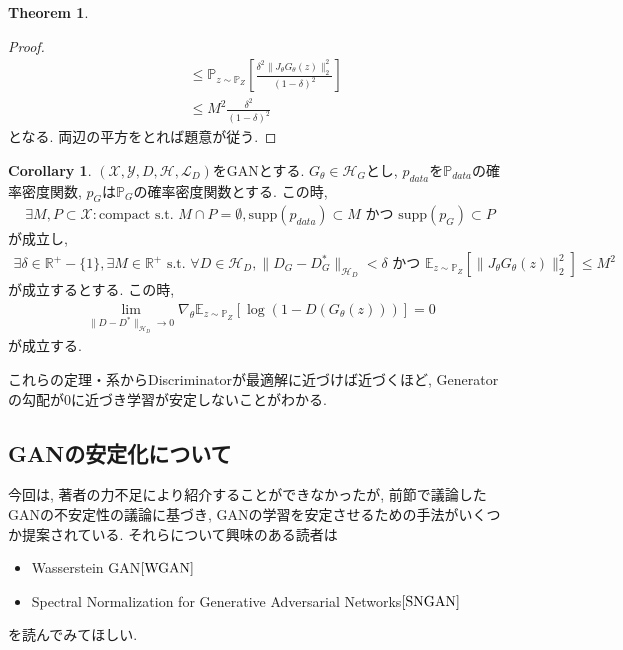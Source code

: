 \documentclass[11pt, a4paper, dvipdfmx]{jsarticle}
\theoremstyle{definition}
\newtheorem{Theorem+}[Axiom+]{Theorem}
\newtheorem{Corollary+}[Axiom+]{Corollary}
\newcommand{\R}{\mathbb{R}}
\newcommand{\X}{\mathcal{X}}
\newcommand{\Y}{\mathcal{Y}}
\newcommand{\Hil}{\mathcal{H}}
\newcommand{\Loss}{\mathcal{L}_{D}}
\newcommand{\MLsp}{(\X, \Y, D, \Hil, \Loss)}
\begin{document}
\begin{Theorem+}
\begin{proof}
\begin{align*}
                                                                                                    &\leq\mathbb{P}_{z\sim\mathbb{P}_{Z}}\left[ \frac{\delta^{2}\|J_{\theta}G_{\theta}(z)\|_{2}^{2}}{(1 - \delta)^{2}} \right]\\
                                                                                                    &\leq M^{2}\frac{\delta^{2}}{(1 - \delta)^{2}}
        \end{align*}
        となる. 両辺の平方をとれば題意が従う. 
    \end{proof}
\end{Theorem+}
\begin{Corollary+}
    $\MLsp$をGANとする. $G_{\theta}\in\Hil_{G}$とし, $p_{data}$を$\mathbb{P}_{data}$の確率密度関数, $p_{G}$は$\mathbb{P}_{G}$の確率密度関数とする. この時, 
    \begin{align*}
        \exists M, P\subset\X:\text{compact s.t. }M\cap P = \emptyset, \text{supp}(p_{data})\subset M\text{ かつ }\text{supp}(p_{G})\subset P
    \end{align*}
    が成立し, 
    \begin{align*}
        \exists\delta\in\R^{+}-\{1\}, \exists M\in\R^{+}\text{ s.t. }\forall D\in\Hil_{D}, \|D_{G} - D_{G}^{*}\|_{\Hil_{D}} <\delta\text{ かつ }\mathbb{E}_{z\sim\mathbb{P}_{Z}}[\|J_{\theta}G_{\theta}(z)\|_{2}^{2}] \leq M^{2}
    \end{align*}
    が成立するとする. この時, 
    \begin{align*}
        \lim_{\|D - D^{*}\|_{\Hil_{D}}\to0}\nabla_{\theta}\mathbb{E}_{z\sim\mathbb{P}_{Z}}[\log(1 - D(G_{\theta}(z)))] = 0
    \end{align*}
    が成立する. 
\end{Corollary+}
これらの定理・系からDiscriminatorが最適解に近づけば近づくほど, Generatorの勾配が0に近づき学習が安定しないことがわかる.
\subsection{GANの安定化について}
今回は, 著者の力不足により紹介することができなかったが, 前節で議論したGANの不安定性の議論に基づき, 
GANの学習を安定させるための手法がいくつか提案されている. それらについて興味のある読者は
\begin{itemize}
    \item Wasserstein GAN$\cite{WGAN}$
    \item Spectral Normalization for Generative Adversarial Networks$\cite{SNGAN}$
\end{itemize}
を読んでみてほしい. 
\end{document}
